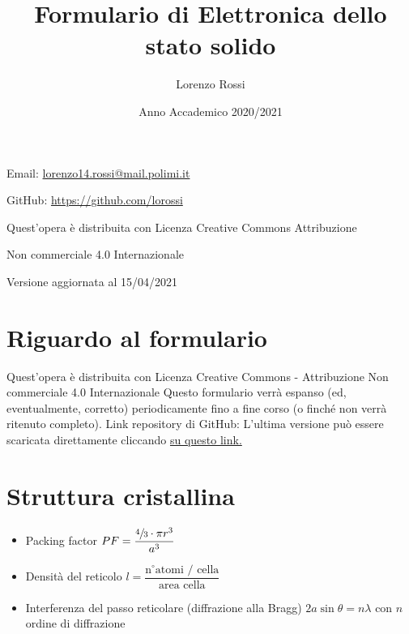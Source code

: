 \documentclass{article}
\title{\Huge Formulario di Elettronica dello stato solido}
\author{\LARGE Lorenzo Rossi}
\date{\LARGE Anno Accademico 2020/2021}
\begin{document}
\maketitle

\vspace{18em}

\large
\begin{doublespacing}\hypersetup{
    urlcolor=black,
  }
  \centerline{Email: \href{mailto://lorenzo14.rossi@mail.polimi.it}{lorenzo14.rossi@mail.polimi.it}}
  \centerline{GitHub: \url{https://github.com/lorossi}}

  \vspace{18em}
  \centerline{Quest'opera è distribuita con Licenza Creative Commons Attribuzione}
  \centerline{Non commerciale 4.0 Internazionale \ccbynceu}
  \centerline{Versione aggiornata al 15/04/2021}
\end{doublespacing}
\newpage


\tableofcontents
\clearpage
{}
\newpage

\section{Riguardo al formulario}
Quest'opera è distribuita con Licenza Creative Commons - Attribuzione Non commerciale 4.0 Internazionale \ccbynceu \newline
Questo formulario verrà espanso (ed, eventualmente, corretto) periodicamente fino a fine corso (o finché non verrà ritenuto completo). \newline
Link repository di GitHub: \url{} \newline
L'ultima versione può essere scaricata direttamente cliccando \href{https://github.com/lorossi/formulario-stato-solido/raw/master/formulario-elettronica-dello-stato-solido.pdf}{su questo link.}


\section{Struttura cristallina}
\begin{itemize}
  \item Packing factor \( PF = \dfrac{ \sfrac{4}{3} \cdot \pi r^3}{a^3} \)
  \item Densità del reticolo \( l = \dfrac{\text{n} ^ \circ \text{atomi / cella}}{\text{area cella}} \)
  \item Interferenza del passo reticolare (diffrazione alla Bragg) \(  2a \sin \theta = n \lambda \) con \( n \) ordine di diffrazione
\end{itemize}
\end{document}
